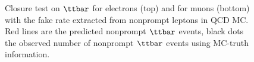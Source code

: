 \begin{figure}[h]
\caption{Closure test on $\ttbar$ for electrons (top) and for muons
  (bottom) with the fake rate extracted from nonprompt leptons in QCD MC. Red lines are the predicted nonprompt $\ttbar$ events, black dots the observed number of nonprompt $\ttbar$ events using MC-truth information.}
\label{fig:closures2_ele}
\end{figure}

